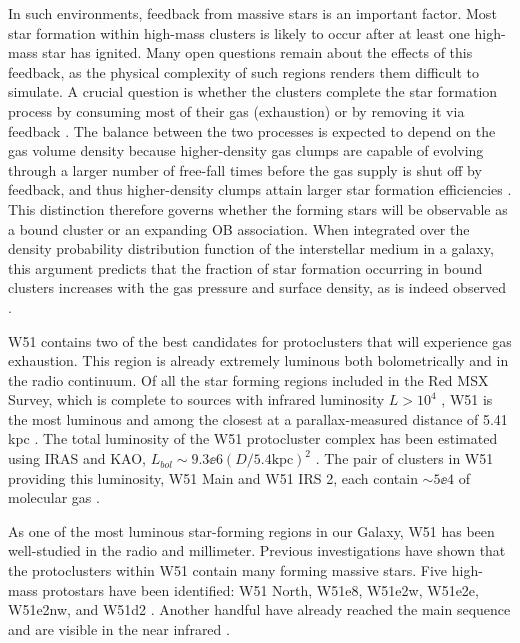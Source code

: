 In such environments, feedback from massive stars is an important factor.  Most star
formation within high-mass clusters is likely to occur after at least one
high-mass star has ignited.  Many open questions remain about the effects of
this feedback, as the physical complexity of such regions renders them
difficult to simulate.  A crucial question is whether the clusters complete the
star formation process by consuming most of their gas (exhaustion) or
by removing it via feedback 
\citep[expulsion;][]{Kruijssen2012b,Longmore2014a,Matzner2015a}.
The balance between the two processes is expected to depend on the gas volume
density because higher-density gas clumps are capable of evolving through a
larger number of free-fall times before the gas supply is shut off by feedback,
and thus higher-density clumps attain larger star formation efficiencies
\citep{Kruijssen2012a}.
This distinction therefore governs whether the forming stars will be observable as a
bound cluster or an expanding OB association.
When integrated over the density probability distribution function of the
interstellar medium in a galaxy, this argument predicts that the fraction of
star formation occurring in bound clusters increases with the gas pressure and
surface density, as is indeed observed \citep{Goddard2010a,Kruijssen2012a,Adamo2015a}.


W51 contains two of the best candidates for protoclusters that will experience
gas exhaustion.  This region is already extremely luminous both bolometrically
and in the radio continuum.  Of all the star forming regions included in the
Red MSX Survey, which is complete to sources with infrared luminosity $L>10^4$
\lsun, W51 is the most luminous \citep{Urquhart2014a} and among the closest at
a parallax-measured distance of 5.41 kpc \citep{Sato2010a,Xu2009a}.  The total
luminosity of the W51 protocluster complex has been estimated using IRAS and
KAO, $L_{bol}\sim9.3\ee{6} (D/5.4\mathrm{kpc})^2$ \lsun
\citep{Harvey1986a,Sievers1991a}.  The pair of clusters in W51 providing this
luminosity, W51 Main and W51 IRS 2, each contain $\sim5\ee{4}$ \msun of
molecular gas \citep{Ginsburg2012a}.

As one of the most luminous star-forming regions in our Galaxy, W51 has been
well-studied in the radio and millimeter.  
Previous investigations have shown that the protoclusters within W51 contain many
forming massive stars. Five high-mass protostars have been identified:
W51 North, W51e8, W51e2w, W51e2e, W51e2nw, and W51d2
\citep{Zhang1997a,Keto2008b,Zapata2008a,Zapata2009a,Zapata2010a,Shi2010b,Shi2010a,Surcis2012a,Goddi2015a,Goddi2016a}.
Another handful have already reached the main sequence and are visible in the
near infrared
\citep{Goldader1994a,Okumura2000a,Kumar2004a,Barbosa2008a,Figueredo2008a}.

